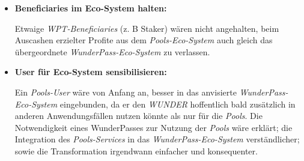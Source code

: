 \begin{Konzept}
\begin{itemize}
	Für \textit{WunderPass} als Product-Provider böte diese Variante zahlreiche zusätzliche \textit{Mechanism-Design}-Möglichkeiten und Erleichterungen hinsichtlich technischer Umsetzung und UX-Gestaltung - gleichwohl das initiale Setup natürlich ungleich komplexer wäre.
	
	Als bestes Beispiel sei hierbei der Umstand genannt, die Sicherstellung einer vorhandenen Balance eines \textbf{WunderPass-Inhabers} an \textit{WUNDER} sei aus unserer Sicht ungleich komfortabler als eine Stable-Doller-Balance. Dies geht unmittelbar aus einer leichteren Handhabe einer \textit{"Fiat-zu-WUNDER"-} vs. \textit{"Fiat-zu-USDT"-Konvertierung} einher.
	\item \textbf{Beneficiaries im Eco-System halten:}
	
	Etwaige \textit{WPT-Beneficiaries} (z. B Staker) wären nicht angehalten, beim Auscashen erzielter Profite aus dem \textit{Pools-Eco-System} auch gleich das übergeordnete \textit{WunderPass-Eco-System} zu verlassen.
	\item \textbf{User für Eco-System sensibilisieren:}
	
	Ein \textit{Pools-User} wäre von Anfang an, besser in das anvisierte \textit{WunderPass-Eco-System} eingebunden, da er den \textit{WUNDER} hoffentlich bald zusätzlich in anderen Anwendungsfällen nutzen könnte als nur für die \textit{Pools}. Die Notwendigkeit eines WunderPasses zur Nutzung der \textit{Pools} wäre erklärt; die Integration des \textit{Pools-Services} in das \textit{WunderPass-Eco-System} verständlicher; sowie die Transformation irgendwann einfacher und konsequenter.
\end{itemize}

\end{Konzept}

